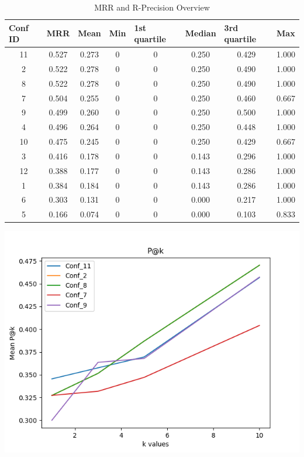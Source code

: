 \documentclass[12pt]{article}
\begin{document}
\begin{table}[]
\centering
\begin{tabular}{|c|c|c|c|c|c|c|c|}
\hline
\multicolumn{1}{|l|}{\textbf{Conf ID}} &
  \multicolumn{1}{l|}{\textbf{MRR}} &
  \multicolumn{1}{l|}{\textbf{Mean}} &
  \multicolumn{1}{l|}{\textbf{Min}} &
  \multicolumn{1}{l|}{\textbf{1st quartile}} &
  \multicolumn{1}{l|}{\textbf{Median}} &
  \multicolumn{1}{l|}{\textbf{3rd quartile}} &
  \multicolumn{1}{l|}{\textbf{Max}} \\ \hline
11 & 0.527 & 0.273 & 0 & 0 & 0.250 & 0.429 & 1.000 \\ \hline
2  & 0.522 & 0.278 & 0 & 0 & 0.250 & 0.490 & 1.000 \\ \hline
8  & 0.522 & 0.278 & 0 & 0 & 0.250 & 0.490 & 1.000 \\ \hline
7  & 0.504 & 0.255 & 0 & 0 & 0.250 & 0.460 & 0.667 \\ \hline
9  & 0.499 & 0.260 & 0 & 0 & 0.250 & 0.500 & 1.000 \\ \hline
4  & 0.496 & 0.264 & 0 & 0 & 0.250 & 0.448 & 1.000 \\ \hline
10 & 0.475 & 0.245 & 0 & 0 & 0.250 & 0.429 & 0.667 \\ \hline
3  & 0.416 & 0.178 & 0 & 0 & 0.143 & 0.296 & 1.000 \\ \hline
12 & 0.388 & 0.177 & 0 & 0 & 0.143 & 0.286 & 1.000 \\ \hline
1  & 0.384 & 0.184 & 0 & 0 & 0.143 & 0.286 & 1.000 \\ \hline
6  & 0.303 & 0.131 & 0 & 0 & 0.000 & 0.217 & 1.000 \\ \hline
5  & 0.166 & 0.074 & 0 & 0 & 0.000 & 0.103 & 0.833 \\ \hline
\end{tabular}
\caption{MRR and R-Precision Overview}
\label{MRR}
\end{table}




\begin{center}
\includegraphics[scale=.75]{Pk.png}
\end{center}
\end{document}
